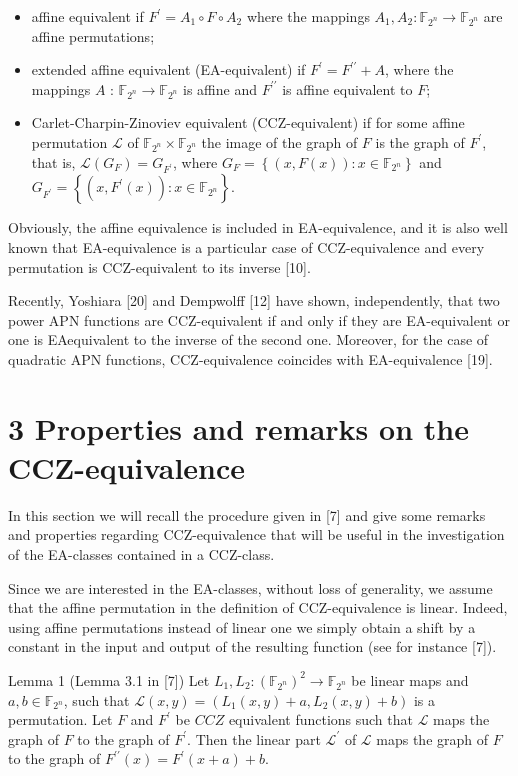 \documentclass[10pt]{article}
\begin{document}
\begin{itemize}
  \item affine equivalent if $F^{\prime}=A_{1} \circ F \circ A_{2}$ where the mappings $A_{1}, A_{2}: \mathbb{F}_{2^{n}} \rightarrow \mathbb{F}_{2^{n}}$ are affine permutations;
  \item extended affine equivalent (EA-equivalent) if $F^{\prime}=F^{\prime \prime}+A$, where the mappings $A$ : $\mathbb{F}_{2^{n}} \rightarrow \mathbb{F}_{2^{n}}$ is affine and $F^{\prime \prime}$ is affine equivalent to $F$;
  \item Carlet-Charpin-Zinoviev equivalent (CCZ-equivalent) if for some affine permutation $\mathscr{L}$ of $\mathbb{F}_{2^{n}} \times \mathbb{F}_{2^{n}}$ the image of the graph of $F$ is the graph of $F^{\prime}$, that is, $\mathscr{L}\left(G_{F}\right)=G_{F^{\prime}}$, where $G_{F}=\left\{(x, F(x)): x \in \mathbb{F}_{2^{n}}\right\}$ and $G_{F^{\prime}}=\left\{\left(x, F^{\prime}(x)\right): x \in \mathbb{F}_{2^{n}}\right\}$.
\end{itemize}

Obviously, the affine equivalence is included in EA-equivalence, and it is also well known that EA-equivalence is a particular case of CCZ-equivalence and every permutation is CCZ-equivalent to its inverse [10].

Recently, Yoshiara [20] and Dempwolff [12] have shown, independently, that two power APN functions are CCZ-equivalent if and only if they are EA-equivalent or one is EAequivalent to the inverse of the second one. Moreover, for the case of quadratic APN functions, CCZ-equivalence coincides with EA-equivalence [19].

\section*{3 Properties and remarks on the CCZ-equivalence}
In this section we will recall the procedure given in [7] and give some remarks and properties regarding CCZ-equivalence that will be useful in the investigation of the EA-classes contained in a CCZ-class.

Since we are interested in the EA-classes, without loss of generality, we assume that the affine permutation in the definition of CCZ-equivalence is linear. Indeed, using affine permutations instead of linear one we simply obtain a shift by a constant in the input and output of the resulting function (see for instance [7]).

Lemma 1 (Lemma 3.1 in [7]) Let $L_{1}, L_{2}:\left(\mathbb{F}_{2^{n}}\right)^{2} \rightarrow \mathbb{F}_{2^{n}}$ be linear maps and $a, b \in \mathbb{F}_{2^{n}}$, such that $\mathscr{L}(x, y)=\left(L_{1}(x, y)+a, L_{2}(x, y)+b\right)$ is a permutation. Let $F$ and $F^{\prime}$ be $C C Z$ equivalent functions such that $\mathscr{L}$ maps the graph of $F$ to the graph of $F^{\prime}$. Then the linear part $\mathscr{L}^{\prime}$ of $\mathscr{L}$ maps the graph of $F$ to the graph of $F^{\prime \prime}(x)=F^{\prime}(x+a)+b$.
\end{document}
